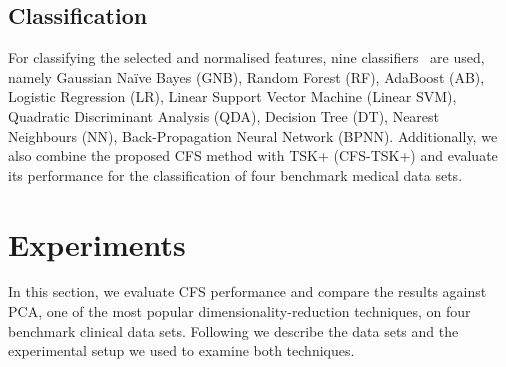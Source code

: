 \documentclass{article}
\newcommand*{\1}{\textcolor{red}}
\begin{document}
\subsection{Classification} \label{sec:featClasf}
For classifying the selected and normalised features, nine classifiers~\cite{zuo2018grooming,8858838} are used, namely Gaussian Na\"ive Bayes (GNB), Random Forest (RF), AdaBoost (AB), Logistic Regression (LR), Linear Support Vector Machine (Linear SVM), Quadratic Discriminant Analysis (QDA), Decision Tree (DT),  Nearest Neighbours (NN), Back-Propagation Neural Network (BPNN). Additionally, we also combine the proposed CFS method with TSK+ (CFS-TSK+) and evaluate its performance for the classification of four benchmark medical data sets.

\section{Experiments} \label{sec:exp}
In this section, we evaluate CFS performance  and compare the results against PCA, one of the most popular  dimensionality-reduction techniques, on four benchmark clinical data sets. Following we describe the data sets and the experimental setup we used to examine both techniques.
\end{document}
